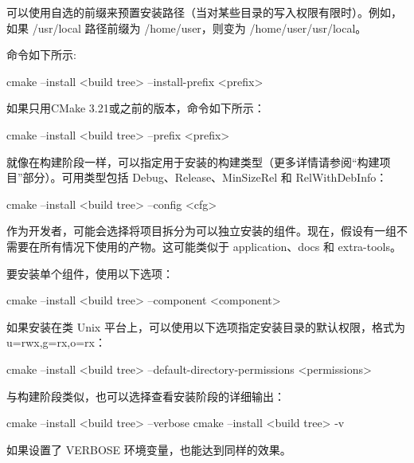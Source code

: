 可以使用自选的前缀来预置安装路径（当对某些目录的写入权限有限时）。例如，如果 /usr/local 路径前缀为 /home/user，则变为 /home/user/usr/local。

命令如下所示:

\begin{shell}
cmake --install <build tree> --install-prefix <prefix>
\end{shell}

如果只用CMake 3.21或之前的版本，命令如下所示：

\begin{shell}
cmake --install <build tree> --prefix <prefix>
\end{shell}


就像在构建阶段一样，可以指定用于安装的构建类型（更多详情请参阅“构建项目”部分）。可用类型包括 Debug、Release、MinSizeRel 和 RelWithDebInfo：

\begin{shell}
cmake --install <build tree> --config <cfg>
\end{shell}


作为开发者，可能会选择将项目拆分为可以独立安装的组件。现在，假设有一组不需要在所有情况下使用的产物。这可能类似于 application、docs 和 extra-tools。

要安装单个组件，使用以下选项：

\begin{shell}
cmake --install <build tree> --component <component>
\end{shell}


如果安装在类 Unix 平台上，可以使用以下选项指定安装目录的默认权限，格式为 u=rwx,g=rx,o=rx：

\begin{shell}
cmake --install <build tree>
      --default-directory-permissions <permissions>
\end{shell}


与构建阶段类似，也可以选择查看安装阶段的详细输出：

\begin{shell}
cmake --install <build tree> --verbose
cmake --install <build tree> -v
\end{shell}

如果设置了 VERBOSE 环境变量，也能达到同样的效果。


